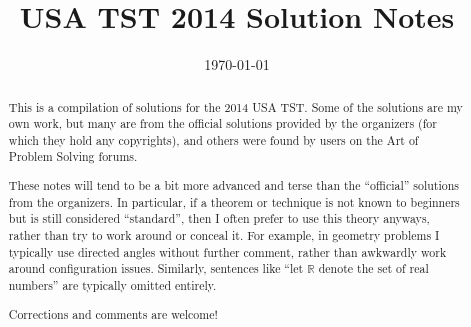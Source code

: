\documentclass[11pt]{scrartcl}
\begin{document}
\title{USA TST 2014 Solution Notes}
\date{\today}

\maketitle
\begin{abstract}
This is a compilation of solutions
for the 2014 USA TST.
Some of the solutions are my own work,
but many are from the official solutions provided by the organizers
(for which they hold any copyrights),
and others were found by users on the Art of Problem Solving forums.

These notes will tend to be a bit more advanced and terse than the ``official''
solutions from the organizers.
In particular, if a theorem or technique is not known to beginners
but is still considered ``standard'', then I often prefer to
use this theory anyways, rather than try to work around or conceal it.
For example, in geometry problems I typically use directed angles
without further comment, rather than awkwardly work around configuration issues.
Similarly, sentences like ``let $\mathbb{R}$ denote the set of real numbers''
are typically omitted entirely.

Corrections and comments are welcome!
\end{abstract}
\tableofcontents
\newpage

\addtocounter{section}{-1}
\end{document}
